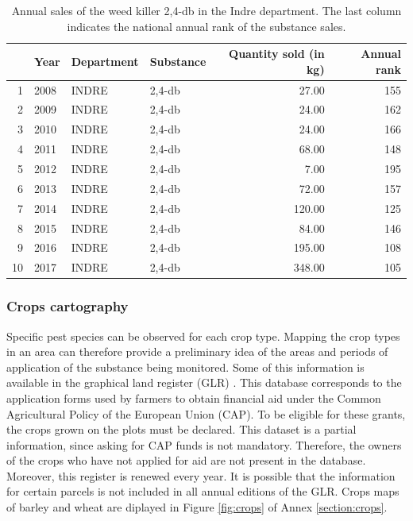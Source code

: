 \begin{table}[ht]\label{tab:bnvd}
\centering
\begin{tabular}{rlllrr}
  \hline
 & Year & Department & Substance & Quantity sold (in kg) & Annual rank \\ 
  \hline
1 & 2008 & INDRE & 2,4-db & 27.00 & 155 \\ 
  2 & 2009 & INDRE & 2,4-db & 24.00 & 162 \\ 
  3 & 2010 & INDRE & 2,4-db & 24.00 & 166 \\ 
  4 & 2011 & INDRE & 2,4-db & 68.00 & 148 \\ 
  5 & 2012 & INDRE & 2,4-db & 7.00 & 195 \\ 
  6 & 2013 & INDRE & 2,4-db & 72.00 & 157 \\ 
  7 & 2014 & INDRE & 2,4-db & 120.00 & 125 \\ 
  8 & 2015 & INDRE & 2,4-db & 84.00 & 146 \\ 
  9 & 2016 & INDRE & 2,4-db & 195.00 & 108 \\ 
  10 & 2017 & INDRE & 2,4-db & 348.00 & 105 \\ 
   \hline
\end{tabular}
   \caption{Annual sales of the weed killer 2,4-db in the Indre department. The last column indicates the national annual rank of the substance sales.}
\end{table}

\subsubsection{Crops cartography}

Specific pest species can be observed for each crop type. Mapping the crop types in an area can therefore provide a preliminary idea of the areas and periods of application of the substance being monitored. Some of this information is available in the graphical land register (GLR) \cite{RPG}. This database corresponds to the application forms used by farmers to obtain financial aid under the Common Agricultural Policy of the European Union (CAP). To be eligible for these grants, the crops grown on the plots must be declared. This dataset is a partial information, since asking for CAP funds is not mandatory. Therefore, the owners of the crops who have not applied for aid are not present in the database. Moreover, this register is renewed every year. It is possible that the information for certain parcels is not included in all annual editions of the GLR. Crops maps of barley and wheat are diplayed in Figure \ref{fig:crops} of Annex \ref{section:crops}.

